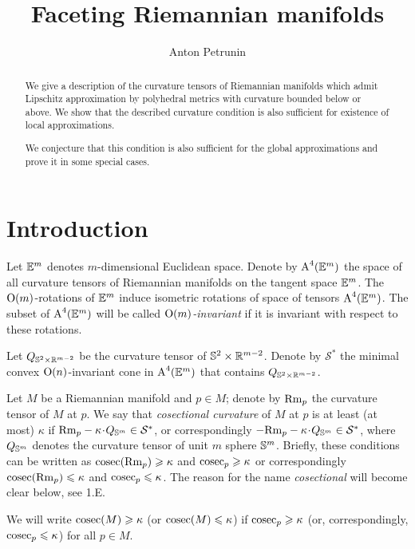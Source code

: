 \documentclass{article}
\begin{document}
\title{Faceting Riemannian manifolds}
\author{Anton Petrunin}
\date{}
\maketitle


\begin{abstract} 
We give a description of the curvature tensors of Riemannian manifolds which admit Lipschitz approximation by polyhedral metrics with curvature bounded below or above.
We show that the described curvature condition is also sufficient for existence of local approximations.

We conjecture that this condition is also sufficient for the global approximations and prove it in some special cases.
\end{abstract}


\section*{Introduction}

Let $\mathbb{E}^m$ denotes  $m$-dimensional Euclidean space.
Denote by $\text{\rm A}^4(\mathbb{E}^m)$ the space of all curvature tensors of Riemannian manifolds on the tangent space $\mathbb{E}^m$.
The $\text{\rm O}(m)$-rotations of $\mathbb{E}^m$ induce isometric rotations of space of tensors  $\text{\rm A}^4(\mathbb{E}^m)$.
The subset of $\text{\rm A}^4(\mathbb{E}^m)$ will be called \emph{$\text{\rm O}(m)$-invariant} if it is invariant with respect to these rotations.

Let $Q_{\mathbb{S}^2\times \mathbb{R}^{m-2}}$ be the curvature tensor of $\mathbb{S}^2\times \mathbb{R}^{m-2}$.
Denote by $\mathcal{S}^*$ the minimal convex $\text{\rm O}(n)$-invariant cone in $\text{\rm A}^4(\mathbb{E}^m)$ that contains $Q_{\mathbb{S}^2\times \mathbb{R}^{m-2}}$.

Let $M$ be a Riemannian manifold and $p\in M$;
denote by $\mathrm{Rm}_p$ the curvature tensor of $M$ at $p$.
We say that \emph{cosectional curvature} of $M$ at $p$ is at least (at most) $\kappa$
if $\Rm_p-\kappa\cdot Q_{\SS^m}\in\mathcal{S}^*$, 
or correspondingly $-\Rm_p-\kappa \cdot Q_{\SS^m}\in\mathcal{S}^*$,
where $Q_{\mathbb{S}^m}$ denotes the curvature tensor of unit $m$ sphere $\mathbb{S}^m$.
Briefly, these conditions can be written as $\mathop{\rm cosec}\nolimits(\mathrm{Rm}_p)\geqslant \kappa$ and $\mathop{\rm cosec}\nolimits_p\geqslant \kappa$ or correspondingly $\mathop{\rm cosec}\nolimits(\mathrm{Rm}_p)\leqslant \kappa$ and $\mathop{\rm cosec}\nolimits_p\leqslant \kappa$.
The reason for the name \emph{cosectional} will become clear below, see 1.E.

We will write $\mathop{\rm cosec}\nolimits(M)\geqslant \kappa$ (or $\mathop{\rm cosec}\nolimits(M)\leqslant \kappa$) if $\mathop{\rm cosec}\nolimits_p\geqslant \kappa$ (or, correspondingly, $\mathop{\rm cosec}\nolimits_p\leqslant \kappa$) for all $p\in M$.
\end{document}
